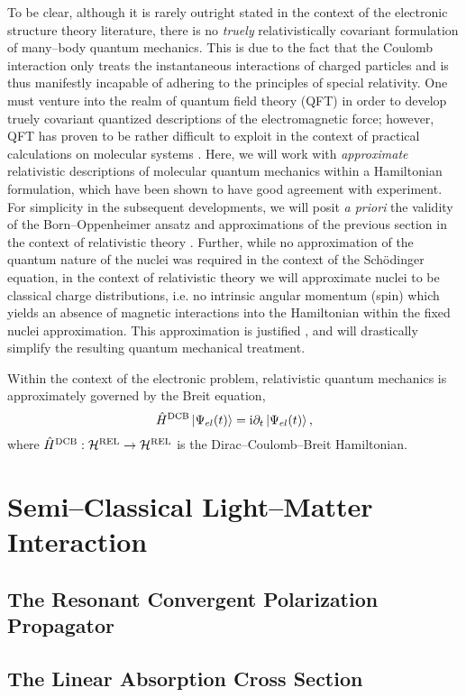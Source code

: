 To be clear, although it is rarely outright stated in the context of the electronic structure theory
literature, there is no \emph{truely} relativistically covariant formulation of many--body quantum 
mechanics. This is due to the fact that the Coulomb interaction only treats the instantaneous interactions
of charged particles and is thus manifestly incapable of adhering to the principles of special relativity.
One must venture into the realm of quantum field theory (QFT) in order to develop truely covariant quantized 
descriptions of the electromagnetic force; however, QFT has proven to be rather difficult to exploit in
the context of practical calculations on molecular systems . Here, we will work with
\emph{approximate} relativistic descriptions of molecular quantum mechanics within a Hamiltonian
formulation, which have been shown to have good agreement with experiment.
For simplicity in the subsequent developments, we will posit \emph{a priori} the validity of the 
Born--Oppenheimer ansatz and approximations of the previous section in the context of relativistic
theory . Further, while no approximation of the quantum nature of the nuclei was required in the 
context of the Sch\"{o}dinger equation, in the context of relativistic theory we will approximate
nuclei to be classical charge distributions, i.e. no intrinsic angular momentum (spin) which
yields an absence of magnetic interactions into the Hamiltonian within the fixed nuclei approximation.
This approximation is justified , and will drastically simplify the resulting 
quantum mechanical treatment.

Within the context of the electronic problem, relativistic quantum mechanics is approximately governed
by the Breit equation,
\begin{equation}
\hat{H}^{\mathrm{DCB}} \left\vert \Psi_{el} (t) \right\rangle = \mathrm i \partial_t \left\vert \Psi_{el} (t) \right\rangle,
\end{equation}
where $\hat{H}^{\mathrm{DCB}} : \mathcal{H}^{\mathrm{REL}} \rightarrow \mathcal{H}^{\mathrm{REL}}$ is the Dirac--Coulomb--Breit Hamiltonian.









\section{Semi--Classical Light--Matter Interaction}
\label{sec:SCLMI}

\subsection{The Resonant Convergent Polarization Propagator}
\label{sec:PolarProp}

\subsection{The Linear Absorption Cross Section}
\label{sec:AbsorptionTheory}

